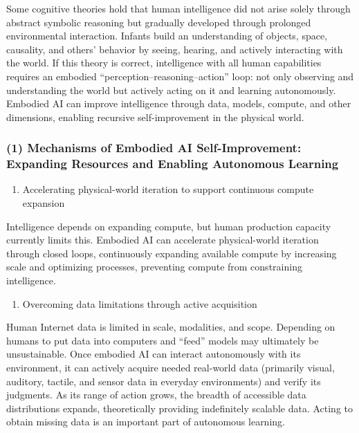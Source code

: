 Some cognitive theories hold that human intelligence did not arise solely through abstract symbolic reasoning but gradually developed through prolonged environmental interaction. Infants build an understanding of objects, space, causality, and others' behavior by seeing, hearing, and actively interacting with the world. If this theory is correct, intelligence with all human capabilities requires an embodied ``perception--reasoning--action'' loop: not only observing and understanding the world but actively acting on it and learning autonomously. Embodied AI can improve intelligence through data, models, compute, and other dimensions, enabling recursive self-improvement in the physical world.

\hypertarget{mechanisms-of-embodied-ai-self-improvement-expanding-resources-and-enabling-autonomous-learning}{%
\subsubsection{(1) Mechanisms of Embodied AI Self-Improvement: Expanding Resources and Enabling Autonomous Learning}\label{mechanisms-of-embodied-ai-self-improvement-expanding-resources-and-enabling-autonomous-learning}}

\begin{enumerate}
\def\labelenumi{\arabic{enumi}.}
\tightlist
\item
  Accelerating physical-world iteration to support continuous compute expansion
\end{enumerate}

Intelligence depends on expanding compute, but human production capacity currently limits this. Embodied AI can accelerate physical-world iteration through closed loops, continuously expanding available compute by increasing scale and optimizing processes, preventing compute from constraining intelligence.

\begin{enumerate}
\def\labelenumi{\arabic{enumi}.}
\setcounter{enumi}{1}
\tightlist
\item
  Overcoming data limitations through active acquisition
\end{enumerate}

Human Internet data is limited in scale, modalities, and scope. Depending on humans to put data into computers and ``feed'' models may ultimately be unsustainable. Once embodied AI can interact autonomously with its environment, it can actively acquire needed real-world data (primarily visual, auditory, tactile, and sensor data in everyday environments) and verify its judgments. As its range of action grows, the breadth of accessible data distributions expands, theoretically providing indefinitely scalable data. Acting to obtain missing data is an important part of autonomous learning.

